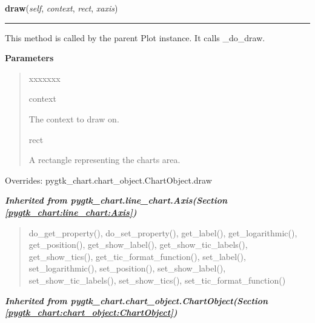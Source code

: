     \vspace{0.5ex}

\hspace{.8\funcindent}\begin{boxedminipage}{\funcwidth}

    \raggedright \textbf{draw}(\textit{self}, \textit{context}, \textit{rect}, \textit{xaxis})

    \vspace{-1.5ex}

    \rule{\textwidth}{0.5\fboxrule}
\setlength{\parskip}{2ex}
    This method is called by the parent Plot instance. It calls \_do\_draw.

\setlength{\parskip}{1ex}
      \textbf{Parameters}
      \vspace{-1ex}

      \begin{quote}
        \begin{Ventry}{xxxxxxx}

          \item[context]

          The context to draw on.

          \item[rect]

          A rectangle representing the charts area.

        \end{Ventry}

      \end{quote}

      Overrides: pygtk\_chart.chart\_object.ChartObject.draw

    \end{boxedminipage}


\large{\textbf{\textit{Inherited from pygtk\_chart.line\_chart.Axis\textit{(Section \ref{pygtk_chart:line_chart:Axis})}}}}

\begin{quote}
do\_get\_property(), do\_set\_property(), get\_label(), get\_logarithmic(), get\_position(), get\_show\_label(), get\_show\_tic\_labels(), get\_show\_tics(), get\_tic\_format\_function(), set\_label(), set\_logarithmic(), set\_position(), set\_show\_label(), set\_show\_tic\_labels(), set\_show\_tics(), set\_tic\_format\_function()
\end{quote}

\large{\textbf{\textit{Inherited from pygtk\_chart.chart\_object.ChartObject\textit{(Section \ref{pygtk_chart:chart_object:ChartObject})}}}}

